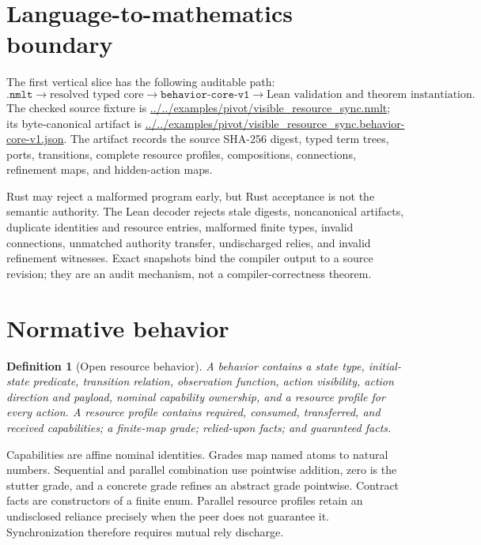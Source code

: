 \documentclass[11pt]{article}
\newtheorem{definition}[theorem]{Definition}
\newcommand{\core}{\texttt{behavior-core-v1}}
\begin{document}
\section{Language-to-mathematics boundary}

The first vertical slice has the following auditable path:
\[
 \texttt{.nmlt}
 \longrightarrow
 \text{resolved typed core}
 \longrightarrow
 \core
 \longrightarrow
 \text{Lean validation and theorem instantiation}.
\]
The checked source fixture is
\url{../../examples/pivot/visible_resource_sync.nmlt}; its byte-canonical
artifact is
\url{../../examples/pivot/visible_resource_sync.behavior-core-v1.json}.
The artifact records the source SHA-256 digest, typed term trees, ports,
transitions, complete resource profiles, compositions, connections,
refinement maps, and hidden-action maps.

Rust may reject a malformed program early, but Rust acceptance is not the
semantic authority.  The Lean decoder rejects stale digests, noncanonical
artifacts, duplicate identities and resource entries, malformed finite types,
invalid connections, unmatched authority transfer, undischarged relies, and
invalid refinement witnesses.  Exact snapshots bind the compiler output to a
source revision; they are an audit mechanism, not a compiler-correctness
theorem.

\section{Normative behavior}

\begin{definition}[Open resource behavior]
A behavior contains a state type, initial-state predicate, transition
relation, observation function, action visibility, action direction and
payload, nominal capability ownership, and a resource profile for every
action.  A resource profile contains required, consumed, transferred, and
received capabilities; a finite-map grade; relied-upon facts; and guaranteed
facts.
\end{definition}

Capabilities are affine nominal identities.  Grades map named atoms to natural
numbers.  Sequential and parallel combination use pointwise addition, zero is
the stutter grade, and a concrete grade refines an abstract grade pointwise.
Contract facts are constructors of a finite enum.  Parallel resource profiles
retain an undisclosed reliance precisely when the peer does not guarantee it.
Synchronization therefore requires mutual rely discharge.
\end{document}
